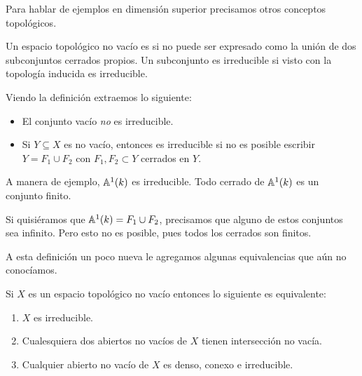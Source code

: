 \documentclass[12pt]{memoir}
\begin{document}
Para hablar de ejemplos en dimensión superior precisamos otros conceptos topológicos.

\begin{Def}\label{def:conj-irreducible}
  Un espacio topológico no vacío es  si no puede ser expresado como la unión de dos subconjuntos cerrados propios. Un subconjunto es irreducible si visto con la topología inducida es irreducible.
\end{Def}

Viendo la definición extraemos lo siguiente:
\begin{itemize}
  \item El conjunto vacío \emph{no} es irreducible.
  \item Si $Y\subseteq X$ es no vacío, entonces es irreducible si no es posible escribir $Y=F_1\cup F_2$ con $F_1,F_2\subset Y$ cerrados en $Y$.
\end{itemize}

\begin{Ex}
  A manera de ejemplo, $\mathbb{A}^1(k)$ es irreducible. Todo cerrado de $\mathbb{A}^1(k)$ es un conjunto finito.\par 
  Si quisiéramos que $\mathbb{A}^1(k)=F_1\cup F_2$, precisamos que alguno de estos conjuntos sea infinito. Pero esto no es posible, pues todos los cerrados son finitos.
\end{Ex}

A esta definición un poco nueva le agregamos algunas equivalencias que aún no conocíamos.

\begin{Prop}\label{prop:equivs-irreducible}
  Si $X$ es un espacio topológico no vacío entonces lo siguiente es equivalente:
  \begin{enumerate}
    \item $X$ es irreducible.
    \item Cualesquiera dos abiertos no vacíos de $X$ tienen intersección no vacía.
    \item Cualquier abierto no vacío de $X$ es denso, conexo e irreducible.
  \end{enumerate}
\end{Prop}
\end{document}
